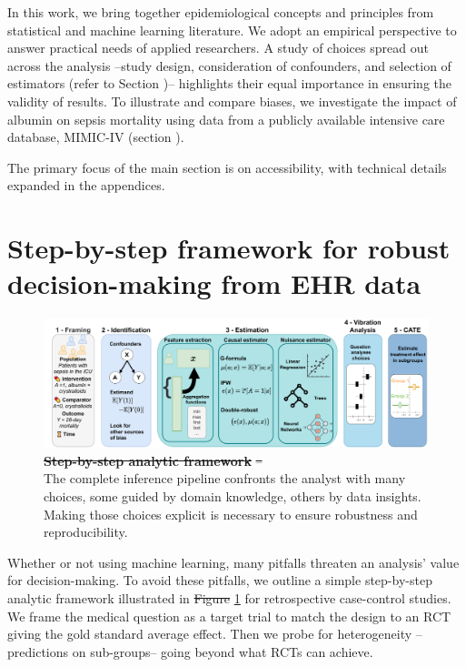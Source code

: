\documentclass[10pt,letterpaper]{article}
\providecommand{\DIFaddtex}[1]{{\protect\color{blue}\uwave{#1}}} %
\providecommand{\DIFdeltex}[1]{{\protect\color{red}\sout{#1}}}                      %
\providecommand{\DIFaddbegin}{} %
\providecommand{\DIFaddend}{} %
\providecommand{\DIFdelbegin}{} %
\providecommand{\DIFdelend}{} %
\providecommand{\DIFaddFL}[1]{\DIFadd{#1}} %
\providecommand{\DIFdelFL}[1]{\DIFdel{#1}} %
\providecommand{\DIFaddbeginFL}{} %
\providecommand{\DIFaddendFL}{} %
\providecommand{\DIFdelbeginFL}{} %
\providecommand{\DIFdelendFL}{} %
\providecommand{\DIFadd}[1]{\texorpdfstring{\DIFaddtex{#1}}{#1}} %
\providecommand{\DIFdel}[1]{\texorpdfstring{\DIFdeltex{#1}}{}} %
\newcommand{\DIFscaledelfig}{0.5}
\newlength{\DIFdelgraphicswidth} %
\newlength{\DIFdelgraphicsheight} %
\newcommand{\DIFaddincludegraphics}[2][]{{\color{blue}\fbox{\DIFOincludegraphics[#1]{#2}}}} %
\newcommand{\DIFdelincludegraphics}[2][]{%
\sbox{\DIFdelgraphicsbox}{\DIFOincludegraphics[#1]{#2}}%
\settoboxwidth{\DIFdelgraphicswidth}{\DIFdelgraphicsbox} %
\settoboxtotalheight{\DIFdelgraphicsheight}{\DIFdelgraphicsbox} %
\scalebox{\DIFscaledelfig}{%
\parbox[b]{\DIFdelgraphicswidth}{\usebox{\DIFdelgraphicsbox}\\[-\baselineskip] \rule{\DIFdelgraphicswidth}{0em}}\llap{\resizebox{\DIFdelgraphicswidth}{\DIFdelgraphicsheight}{%
\setlength{\unitlength}{\DIFdelgraphicswidth}%
\begin{picture}(1,1)%
\thicklines\linethickness{2pt} %
{\color[rgb]{1,0,0}\put(0,0){\framebox(1,1){}}}%
{\color[rgb]{1,0,0}\put(0,0){\line( 1,1){1}}}%
{\color[rgb]{1,0,0}\put(0,1){\line(1,-1){1}}}%
\end{picture}%
}\hspace*{3pt}}} %
} %
\DeclareRobustCommand{\DIFaddbegin}{\DIFOaddbegin \let\includegraphics\DIFaddincludegraphics} %
\DeclareRobustCommand{\DIFaddend}{\DIFOaddend \let\includegraphics\DIFOincludegraphics} %
\DeclareRobustCommand{\DIFdelbegin}{\DIFOdelbegin \let\includegraphics\DIFdelincludegraphics} %
\DeclareRobustCommand{\DIFdelend}{\DIFOaddend \let\includegraphics\DIFOincludegraphics} %
\DeclareRobustCommand{\DIFaddbeginFL}{\DIFOaddbeginFL \let\includegraphics\DIFaddincludegraphics} %
\DeclareRobustCommand{\DIFaddendFL}{\DIFOaddendFL \let\includegraphics\DIFOincludegraphics} %
\DeclareRobustCommand{\DIFdelbeginFL}{\DIFOdelbeginFL \let\includegraphics\DIFdelincludegraphics} %
\DeclareRobustCommand{\DIFdelendFL}{\DIFOaddendFL \let\includegraphics\DIFOincludegraphics} %
\begin{document}
In this work, we bring together epidemiological concepts and
principles from statistical and machine learning literature. We adopt
an empirical perspective to answer practical needs of applied researchers.
A study of choices spread out across the analysis
--study design, consideration of
confounders, and selection of estimators (refer to Section
)-- highlights their equal importance in ensuring
the validity of results. To illustrate and compare biases, we investigate
the impact of albumin on sepsis mortality using data from a publicly available
intensive care database, MIMIC-IV \cite{johnson2020mimic} (section
).

The primary focus of the main section is on accessibility, with technical
details expanded in the appendices.

%
\section*{Step-by-step framework for robust decision-making from EHR data}\label{sec:inference_flow}

\begin{figure}[t!]
  \centering
  \DIFdelbeginFL %
  \DIFdelendFL \DIFaddbeginFL \includegraphics[width=0.9\linewidth]{img_final/Fig1.pdf}
  \DIFaddendFL \caption{\DIFdelbeginFL \textbf{\DIFdelFL{Step-by-step analytic framework}} %
    \DIFdelFL{-- }\DIFdelendFL \DIFaddbeginFL \textbf{\DIFaddFL{Step-by-step analytic framework.}}\\\DIFaddendFL The complete
    inference pipeline confronts the analyst with
    many choices, some guided by domain knowledge, others
    by data insights. Making those choices explicit is necessary to ensure
    robustness and reproducibility.}\label{fig:inference_framework}
\end{figure}



Whether or not using machine learning, many pitfalls threaten an analysis'
value for decision-making. To avoid these pitfalls, we outline a simple
step-by-step analytic framework illustrated in \DIFdelbegin \DIFdel{Figure
}\DIFdelend \DIFaddbegin \DIFadd{Fig
}\DIFaddend \ref{fig:inference_framework} for retrospective case-control studies. We frame
the medical question as a target trial \cite{hernan2021methods} to match the
design to an RCT giving the gold standard average effect. Then we probe for
heterogeneity --predictions on sub-groups--  going beyond what RCTs can
achieve.
\end{document}
